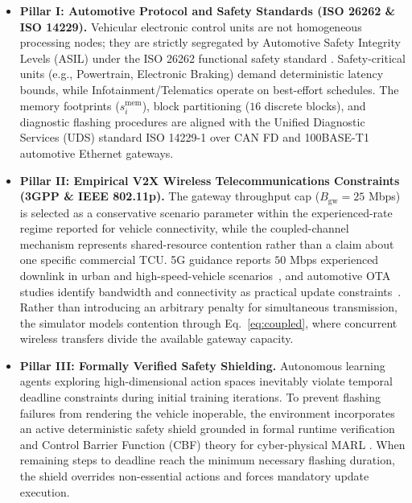 \documentclass[conference]{IEEEtran}
\begin{document}
\begin{itemize}[leftmargin=*]
  \item \textbf{Pillar I: Automotive Protocol and Safety Standards (ISO 26262 \& ISO 14229).}
  Vehicular electronic control units are not homogeneous processing nodes; they are strictly
  segregated by Automotive Safety Integrity Levels (ASIL) under the ISO 26262 functional safety
  standard \cite{iso26262}. Safety-critical units (e.g., Powertrain, Electronic Braking)
  demand deterministic latency bounds, while Infotainment/Telematics operate on best-effort
  schedules. The memory footprints ($s_i^{\text{mem}}$), block partitioning ($16$ discrete blocks),
  and diagnostic flashing procedures are aligned with the Unified Diagnostic Services (UDS)
  standard ISO 14229-1 \cite{iso14229} over CAN FD and 100BASE-T1 automotive Ethernet gateways.

  \item \textbf{Pillar II: Empirical V2X Wireless Telecommunications Constraints (3GPP \& IEEE 802.11p).}
  The gateway throughput cap ($B_{\text{gw}} = 25$ Mbps) is selected as a conservative
  scenario parameter within the experienced-rate regime reported for vehicle connectivity,
  while the coupled-channel mechanism represents shared-resource contention rather than a
  claim about one specific commercial TCU. 5G guidance reports $50$ Mbps experienced
  downlink in urban and high-speed-vehicle scenarios~\cite{gsma5g}, and automotive OTA
  studies identify bandwidth and connectivity as practical update constraints~\cite{halder2020ota,ota_survey}.
  Rather than introducing an arbitrary penalty for simultaneous transmission, the simulator
  models contention through Eq.~\ref{eq:coupled}, where concurrent wireless transfers divide
  the available gateway capacity.

  \item \textbf{Pillar III: Formally Verified Safety Shielding.}
  Autonomous learning agents exploring high-dimensional action spaces inevitably violate temporal
  deadline constraints during initial training iterations. To prevent flashing failures from
  rendering the vehicle inoperable, the environment incorporates an active deterministic safety
  shield grounded in formal runtime verification and Control Barrier Function (CBF) theory for
  cyber-physical MARL \cite{ames2019cbf, alshiekh2018shielding, dalal2018safe}. When remaining
  steps to deadline reach the minimum necessary flashing duration, the shield overrides non-essential
  actions and forces mandatory update execution.


\end{itemize}
\end{document}

